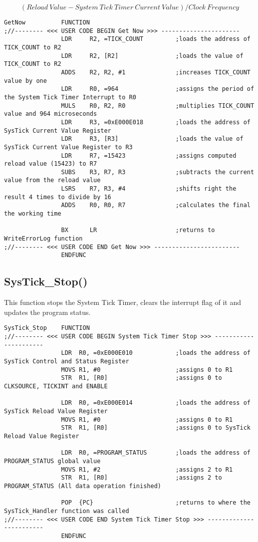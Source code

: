 \documentclass[pdftex,12pt,a4paper]{article}
\begin{document}
\begin{equation}
    (Reload~Value - System~Tick~Timer~Current~Value) / Clock~Frequency
\end{equation}
\newpage

\begin{lstlisting}[caption=GetNow Function, style=customasm]
GetNow			FUNCTION			
;//-------- <<< USER CODE BEGIN Get Now >>> ----------------------				
				LDR		R2, =TICK_COUNT			;loads the address of TICK_COUNT to R2
				LDR		R2, [R2]				;loads the value of TICK_COUNT to R2
				ADDS	R2, R2, #1				;increases TICK_COUNT value by one
				LDR		R0, =964				;assigns the period of the System Tick Timer Interrupt to R0
				MULS	R0, R2, R0				;multiplies TICK_COUNT value and 964 microseconds
				LDR  	R3, =0xE000E018			;loads the address of SysTick Current Value Register
				LDR		R3, [R3]				;loads the value of SysTick Current Value Register to R3
				LDR	 	R7, =15423				;assigns computed reload value (15423) to R7
				SUBS	R3, R7, R3				;subtracts the current value from the reload value
				LSRS	R7, R3, #4				;shifts right the result 4 times to divide by 16
				ADDS	R0, R0, R7				;calculates the final the working time
				
				BX		LR						;returns to WriteErrorLog function
;//-------- <<< USER CODE END Get Now >>> ------------------------
				ENDFUNC
\end{lstlisting}
\newpage
\subsection{SysTick\_Stop()}
\par This function stops the System Tick Timer, clears the interrupt flag of it and updates the program status.
\begin{lstlisting}[caption=SysTick\_Stop, style=customasm]
SysTick_Stop	FUNCTION			
;//-------- <<< USER CODE BEGIN System Tick Timer Stop >>> ----------------------	
				LDR	 R0, =0xE000E010			;loads the address of SysTick Control and Status Register
				MOVS R1, #0						;assigns 0 to R1
				STR	 R1, [R0]					;assigns 0 to CLKSOURCE, TICKINT and ENABLE
				
				LDR	 R0, =0xE000E014			;loads the address of SysTick Reload Value Register
				MOVS R1, #0						;assigns 0 to R1
				STR	 R1, [R0]					;assigns 0 to SysTick Reload Value Register
				
				LDR	 R0, =PROGRAM_STATUS		;loads the address of PROGRAM_STATUS global value
				MOVS R1, #2						;assigns 2 to R1
				STR	 R1, [R0]					;assigns 2 to PROGRAM_STATUS (All data operation finished)
				
				POP	 {PC}						;returns to where the SysTick_Handler function was called
;//-------- <<< USER CODE END System Tick Timer Stop >>> ------------------------				
				ENDFUNC
\end{lstlisting}
\newpage
\end{document}

